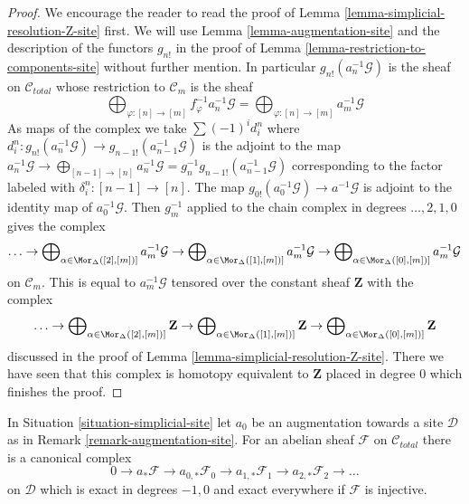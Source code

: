 \begin{proof}
We encourage the reader to read the proof of
Lemma \ref{lemma-simplicial-resolution-Z-site} first.
We will use Lemma \ref{lemma-augmentation-site} and
the description of the functors $g_{n!}$ in the proof of
Lemma \ref{lemma-restriction-to-components-site} without further mention.
In particular $g_{n!}(a_n^{-1}\mathcal{G})$ is the
sheaf on $\mathcal{C}_{total}$ whose restriction to $\mathcal{C}_m$
is the sheaf
$$
\bigoplus\nolimits_{\varphi : [n] \to [m]} f_\varphi^{-1}a_n^{-1}\mathcal{G} =
\bigoplus\nolimits_{\varphi : [n] \to [m]} a_m^{-1}\mathcal{G}
$$
As maps of the complex we take $\sum (-1)^i d^n_i$ where
$d^n_i : g_{n!}(a_n^{-1}\mathcal{G}) \to g_{n - 1!}(a_{n - 1}^{-1}\mathcal{G})$
is the adjoint to the map
$a_n^{-1}\mathcal{G} \to \bigoplus_{[n - 1] \to [n]} a_n^{-1}\mathcal{G} =
g_n^{-1}g_{n - 1!}(a_{n - 1}^{-1}\mathcal{G})$
corresponding to the factor labeled with $\delta^n_i : [n - 1] \to [n]$.
The map $g_{0!}(a_0^{-1}\mathcal{G}) \to a^{-1}\mathcal{G}$ is adjoint
to the identity map of $a_0^{-1}\mathcal{G}$.
Then $g_m^{-1}$ applied to the chain complex in degrees
$\ldots, 2, 1, 0$ gives the complex
$$
\ldots \to
\bigoplus\nolimits_{\alpha \in \Mor_\Delta([2], [m])]} a_m^{-1}\mathcal{G} \to
\bigoplus\nolimits_{\alpha \in \Mor_\Delta([1], [m])]} a_m^{-1}\mathcal{G} \to
\bigoplus\nolimits_{\alpha \in \Mor_\Delta([0], [m])]} a_m^{-1}\mathcal{G}
$$
on $\mathcal{C}_m$. This is equal to $a_m^{-1}\mathcal{G}$
tensored over the constant sheaf $\mathbf{Z}$ with the complex
$$
\ldots \to
\bigoplus\nolimits_{\alpha \in \Mor_\Delta([2], [m])]} \mathbf{Z} \to
\bigoplus\nolimits_{\alpha \in \Mor_\Delta([1], [m])]} \mathbf{Z} \to
\bigoplus\nolimits_{\alpha \in \Mor_\Delta([0], [m])]} \mathbf{Z}
$$
discussed in the proof of Lemma \ref{lemma-simplicial-resolution-Z-site}.
There we have seen that this complex is homotopy equivalent to
$\mathbf{Z}$ placed in degree $0$ which finishes the proof.
\end{proof}

\begin{lemma}
\label{lemma-augmentation-cech-complex}
In Situation \ref{situation-simplicial-site} let
$a_0$ be an augmentation towards a site $\mathcal{D}$
as in Remark \ref{remark-augmentation-site}.
For an abelian sheaf $\mathcal{F}$ on $\mathcal{C}_{total}$
there is a canonical complex
$$
0 \to a_*\mathcal{F} \to a_{0, *}\mathcal{F}_0 \to a_{1, *}\mathcal{F}_1 \to
a_{2, *}\mathcal{F}_2 \to \ldots
$$
on $\mathcal{D}$ which is exact in degrees $-1, 0$ and
exact everywhere if $\mathcal{F}$ is injective.
\end{lemma}

